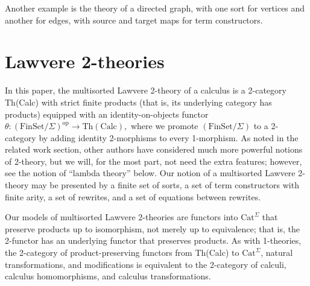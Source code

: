 \documentclass{llncs}
\newcommand{\maps}{\colon}
\renewcommand{\:}{\colon}
\newcommand{\FinSet}{\mathrm{FinSet}}
\newcommand{\Cat}{\mathrm{Cat}}
\newcommand{\op}{\mathrm{op}}
\begin{document}
Another example is the theory of a directed graph, with one sort for vertices and another for edges, with source and target maps for term constructors.

\section {Lawvere 2-theories}
In this paper, the multisorted Lawvere 2-theory of a calculus is a 2-category Th(Calc) with strict finite products (that is, its underlying category has products) equipped with an identity-on-objects functor $\theta\maps (\FinSet/\Sigma)^\op \to \mathrm{Th(Calc)},$ where we promote $(\FinSet/\Sigma)$ to a 2-category by adding identity 2-morphisms to every 1-morphism.  As noted in the related work section, other authors have considered much more powerful notions of 2-theory, but we will, for the most part, not need the extra features; however, see the notion of ``lambda theory'' below.  Our notion of a multisorted Lawvere 2-theory may be presented by a finite set of sorts, a set of term constructors with finite arity, a set of rewrites, and a set of equations between rewrites.  

Our models of multisorted Lawvere 2-theories are functors into $\Cat^\Sigma$ that preserve products up to isomorphism, not merely up to equivalence; that is, the 2-functor has an underlying functor that preserves products.  As with 1-theories, the 2-category of product-preserving functors from Th(Calc) to $\Cat^\Sigma$, natural transformations, and modifications is equivalent to the 2-category of calculi, calculus homomorphisms, and calculus transformations.
\end{document}

